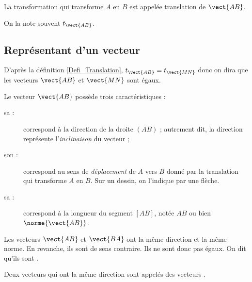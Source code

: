 \documentclass[10pt,openright,twoside,french]{book}
\begin{document}
\begin{Defi}
    La transformation qui transforme $A$ en $B$ est appelée translation de  $\vect{AB}$.\par
    On la note souvent $t_{\vect{AB}}$.
\end{Defi}

\subsection{Représentant d'un vecteur}

\begin{Defi}
    D'après la définition \ref{Defi_Translation}, $t_{\vect{AB}} = t_{\vect{MN}}$ donc on dira que les vecteurs $\vect{AB}$ et $\vect{MN}$ sont égaux.\par
    Le vecteur $\vect{AB}$ possède trois caractéristiques :
    \begin{description}
        \item[sa  :] correspond à la direction de la droite $(AB)$ ; autrement dit, la direction représente l'\textit{inclinaison} du vecteur ;
        \item[son  :] correspond au sens de \textit{déplacement} de $A$ vers $B$ donné par la translation qui transforme $A$ en $B$. Sur un dessin, on l'indique par une flèche.
        \item[sa  :] correspond à la longueur du segment $[AB]$, notée $AB$ ou bien $\norme{\vect{AB}}$.
    \end{description}
\end{Defi}

\begin{Exemple}
    Les vecteurs $\vect{AB}$ et $\vect{BA}$ ont la même direction et la même norme. En revanche, ils sont de sens contraire. Ils ne sont donc pas égaux. On dit qu'ils sont .
\end{Exemple}

\begin{Defi}
    Deux vecteurs qui ont la même direction sont appelés des vecteurs .
    \begin{center}
    \end{center}
\end{Defi}
\end{document}
